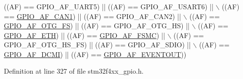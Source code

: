 \begin{DoxyCode}
                          ((AF) == GPIO\_AF\_UART5)     || ((AF) == GPIO\_AF\_USART6) || \(\backslash\)
                          ((AF) == \hyperlink{group___g_p_i_o___alternat__function__selection__define_gaf5defeedc302bf348e31dd7bdcdd882f}{GPIO\_AF\_CAN1})      || ((AF) == GPIO\_AF\_CAN2)   || \(\backslash\)
                          ((AF) == \hyperlink{group___g_p_i_o___alternat__function__selection__define_gaeba0aeefec841e505170efc7762ae588}{GPIO\_AF\_OTG\_FS})    || ((AF) == GPIO\_AF\_OTG\_HS) || \(\backslash\)
                          ((AF) == \hyperlink{group___g_p_i_o___alternat__function__selection__define_ga26cf3f30fe5154bd461b27fab58e45e2}{GPIO\_AF\_ETH})       || ((AF) == 
      \hyperlink{group___g_p_i_o___alternat__function__selection__define_ga8378a89ae1a16d5ae5d315ca49a57674}{GPIO\_AF\_FSMC})   || \(\backslash\)
                          ((AF) == GPIO\_AF\_OTG\_HS\_FS) || ((AF) == GPIO\_AF\_SDIO)   || \(\backslash\)
                          ((AF) == \hyperlink{group___g_p_i_o___alternat__function__selection__define_gaa7bfafac663bac5d437bd6d6a2f6774d}{GPIO\_AF\_DCMI})      || ((AF) == 
      \hyperlink{group___g_p_i_o___alternat__function__selection__define_gacd5e7846b3709cddbf41ece2b1fb068e}{GPIO\_AF\_EVENTOUT}))
\end{DoxyCode}


Definition at line 327 of file stm32f4xx\+\_\+gpio.\+h.

